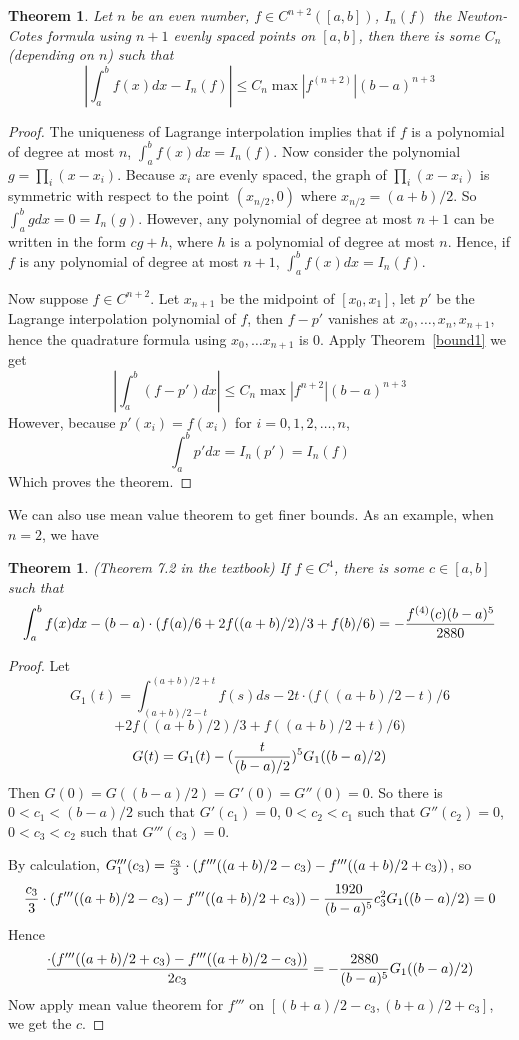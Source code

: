 \documentclass[20pt]{article} %
\theoremstyle{break}
\newtheorem{thm}[definition]{Theorem}
\begin{document}
\begin{thm}\label{qbound} Let $n$ be an even number, $f\in C^{n+2}([a, b])$, $I_n(f)$ the Newton-Cotes formula using $n+1$ evenly spaced points on $[a, b]$, then there is some $C_n$ (depending on $n$) such that
  \[|\int_a^bf(x)dx-I_n(f)|\leq C_n\max|f^{(n+2)}|(b-a)^{n+3}\]
\end{thm}
\begin{proof}
  The uniqueness of Lagrange interpolation implies that if $f$ is a polynomial of degree at most $n$, $\int_a^bf(x)dx=I_n(f)$. Now consider the polynomial $g=\prod_i(x-x_i)$. Because $x_i$ are evenly spaced, the graph of $\prod_i(x-x_i)$ is symmetric with respect to the point $(x_{n/2}, 0)$ where $x_{n/2}=(a+b)/2$. So $\int_a^bgdx=0=I_n(g)$. However, any polynomial of degree at most $n+1$ can be written in the form $cg+h$, where $h$ is a polynomial of degree at most $n$. Hence, if $f$ is any polynomial of degree at most $n+1$, $\int_a^bf(x)dx=I_n(f)$.\\

\newpage
  
  Now suppose $f\in C^{n+2}$. Let $x_{n+1}$ be the midpoint of $[x_0, x_1]$, let $p'$ be the Lagrange interpolation polynomial of $f$, then $f-p'$ vanishes at $x_0, \dots, x_n, x_{n+1}$, hence the quadrature formula using $x_0, \dots x_{n+1}$ is $0$. Apply Theorem~\ref{bound1} we get
  \[|\int_a^b(f-p')dx|\leq C_n\max|f^{n+2}|(b-a)^{n+3}\]
  However, because $p'(x_i)=f(x_i)$ for $i=0, 1, 2, \dots, n$,
  \[\int_a^bp'dx=I_n(p')=I_n(f)\]
  Which proves the theorem.
\end{proof}

\newpage

We can also use mean value theorem to get finer bounds. As an example, when $n=2$, we have

\begin{thm}(Theorem 7.2 in the textbook) If $f\in C^4$, there is some $c\in [a, b]$ such that
  \[\int_a^b f(x)dx-(b-a)\cdot(f(a)/6+2f((a+b)/2)/3+f(b)/6)=-{f^{(4)}(c)(b-a)^5\over 2880}\]
\end{thm}

\begin{proof}
  Let
  \[G_1(t)=\int_{(a+b)/2-t}^{(a+b)/2+t}f(s)ds-2t\cdot(f((a+b)/2-t)/6\]
  \[+2f((a+b)/2)/3+f((a+b)/2+t)/6)\]
  \[G(t)=G_1(t)-({t\over (b-a)/2})^5G_1((b-a)/2)\]
  Then $G(0)=G((b-a)/2)=G'(0)=G''(0)=0$. So there is $0<c_1<(b-a)/2$ such that $G'(c_1)=0$, $0<c_2<c_1$ such that $G''(c_2)=0$, $0<c_3<c_2$ such that $G'''(c_3)=0$.

\newpage

By calculation, $G_1'''(c_3)={c_3\over 3}\cdot(f'''((a+b)/2-c_3)-f'''((a+b)/2+c_3))$, so
\[{c_3\over 3}\cdot(f'''((a+b)/2-c_3)-f'''((a+b)/2+c_3))-{1920\over (b-a)^5}c_3^2G_1((b-a)/2)=0\]
Hence
\[{\cdot(f'''((a+b)/2+c_3)-f'''((a+b)/2-c_3))\over 2c_3}=-{2880\over (b-a)^5}G_1((b-a)/2)\]
Now apply mean value theorem for $f'''$ on $[(b+a)/2-c_3, (b+a)/2+c_3]$, we get the $c$. 
\end{proof}
\end{document}
